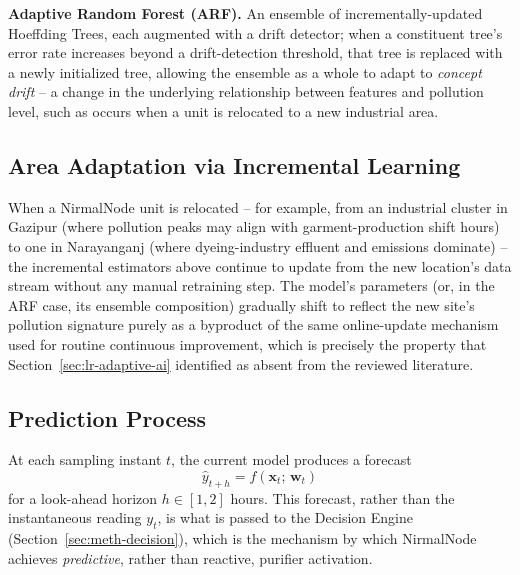 \textbf{Adaptive Random Forest (ARF).} An ensemble of incrementally-updated Hoeffding Trees, each augmented with a drift detector; when a constituent tree's error rate increases beyond a drift-detection threshold, that tree is replaced with a newly initialized tree, allowing the ensemble as a whole to adapt to \emph{concept drift} -- a change in the underlying relationship between features and pollution level, such as occurs when a unit is relocated to a new industrial area.

\subsection{Area Adaptation via Incremental Learning}
When a NirmalNode unit is relocated -- for example, from an industrial cluster in Gazipur (where pollution peaks may align with garment-production shift hours) to one in Narayanganj (where dyeing-industry effluent and emissions dominate) -- the incremental estimators above continue to update from the new location's data stream without any manual retraining step. The model's parameters (or, in the ARF case, its ensemble composition) gradually shift to reflect the new site's pollution signature purely as a byproduct of the same online-update mechanism used for routine continuous improvement, which is precisely the property that Section~\ref{sec:lr-adaptive-ai} identified as absent from the reviewed literature.

\subsection{Prediction Process}
At each sampling instant $t$, the current model produces a forecast
\begin{equation}
\hat{y}_{t+h} = f(\mathbf{x}_t;\, \mathbf{w}_t)
\label{eq:forecast}
\end{equation}
for a look-ahead horizon $h \in [1,2]$ hours. This forecast, rather than the instantaneous reading $y_t$, is what is passed to the Decision Engine (Section~\ref{sec:meth-decision}), which is the mechanism by which NirmalNode achieves \emph{predictive}, rather than reactive, purifier activation.

